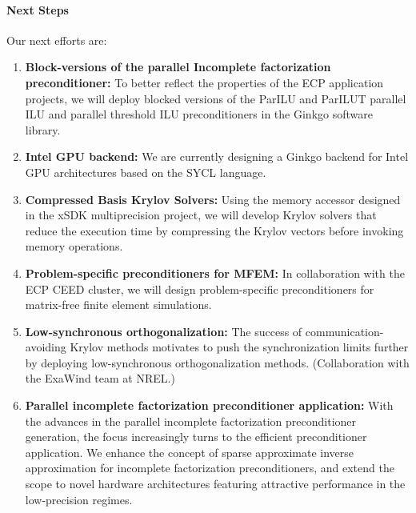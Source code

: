 \paragraph{Next Steps}


Our next efforts are:
\begin{enumerate}
	\item \textbf{Block-versions of the parallel Incomplete factorization 
	preconditioner:} To better reflect the properties of the ECP application 
	projects, we will deploy blocked versions of the ParILU and ParILUT 
	parallel ILU and parallel threshold ILU preconditioners in the Ginkgo 
	software library.
	\item \textbf{Intel GPU backend:} We are currently designing a Ginkgo 
	backend for Intel GPU architectures based on the SYCL language.
	\item \textbf{Compressed Basis Krylov Solvers:} Using the memory accessor 
	designed in the xSDK multiprecision project, we will develop Krylov solvers 
	that reduce the execution time by compressing the Krylov vectors before 
	invoking memory operations.
	\item \textbf{Problem-specific preconditioners for MFEM:} In collaboration 
	with the ECP CEED cluster, we will design problem-specific preconditioners 
	for matrix-free finite element simulations.
	\item \textbf{Low-synchronous orthogonalization:} The success of 
	communication-avoiding Krylov methods motivates to push the synchronization 
	limits further by deploying low-synchronous orthogonalization methods.
        (Collaboration with the ExaWind team at NREL.)
	\item \textbf{Parallel incomplete factorization preconditioner 
	application:} With the advances in the parallel incomplete factorization
	preconditioner generation, the focus increasingly turns to the efficient 
	preconditioner application. We enhance the concept of sparse approximate 
	inverse approximation for incomplete factorization preconditioners, and 
	extend the scope to novel hardware architectures featuring attractive 
	performance in the low-precision regimes.

\end{enumerate}
